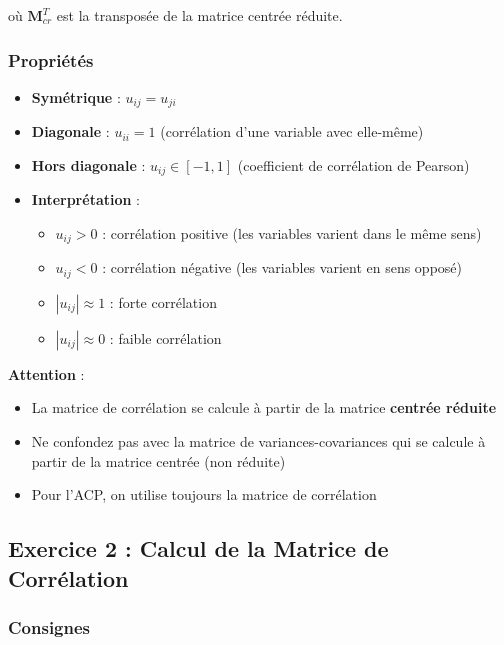 \documentclass[11pt,a4paper]{article}
\begin{document}
où $\mathbf{M}_{cr}^T$ est la transposée de la matrice centrée réduite.

\subsubsection{Propriétés}

\begin{itemize}
    \item \textbf{Symétrique} : $u_{ij} = u_{ji}$
    \item \textbf{Diagonale} : $u_{ii} = 1$ (corrélation d'une variable avec elle-même)
    \item \textbf{Hors diagonale} : $u_{ij} \in [-1, 1]$ (coefficient de corrélation de Pearson)
    \item \textbf{Interprétation} :
    \begin{itemize}
        \item $u_{ij} > 0$ : corrélation positive (les variables varient dans le même sens)
        \item $u_{ij} < 0$ : corrélation négative (les variables varient en sens opposé)
        \item $|u_{ij}| \approx 1$ : forte corrélation
        \item $|u_{ij}| \approx 0$ : faible corrélation
    \end{itemize}
\end{itemize}

\begin{attentionbox}
\textbf{Attention} : 
\begin{itemize}
    \item La matrice de corrélation se calcule à partir de la matrice \textbf{centrée réduite}
    \item Ne confondez pas avec la matrice de variances-covariances qui se calcule à partir de la matrice centrée (non réduite)
    \item Pour l'ACP, on utilise toujours la matrice de corrélation
\end{itemize}
\end{attentionbox}

\newpage

\subsection{Exercice 2 : Calcul de la Matrice de Corrélation}

\subsubsection{Consignes}
\end{document}
